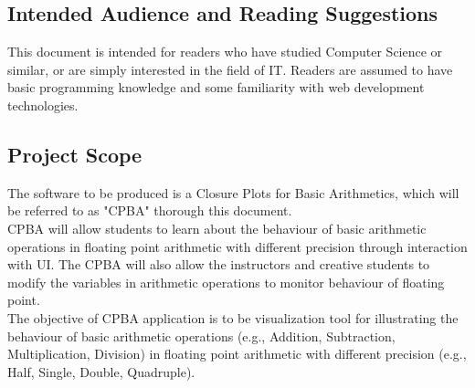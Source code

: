 \documentclass[11pt]{article}
\begin{document}
\subsection{Intended Audience and Reading Suggestions}
This document is intended for readers who have studied Computer Science or similar, or are simply interested in the field of IT. Readers are assumed to have basic programming knowledge and some familiarity with web development technologies.

\subsection{Project Scope}
The software to be produced is a Closure Plots for Basic Arithmetics, which will be referred to as "CPBA" thorough this document.\\

CPBA will allow students to learn about the behaviour of basic arithmetic operations in floating point arithmetic with different precision through interaction with UI. The CPBA will also allow the instructors and creative students to modify the variables in arithmetic operations to monitor behaviour of floating point.\\

The objective of CPBA application is to be visualization tool for illustrating the behaviour of basic arithmetic operations (e.g., Addition, Subtraction, Multiplication, Division) in floating point arithmetic with different precision (e.g., Half, Single, Double, Quadruple).\\




\end{document}
